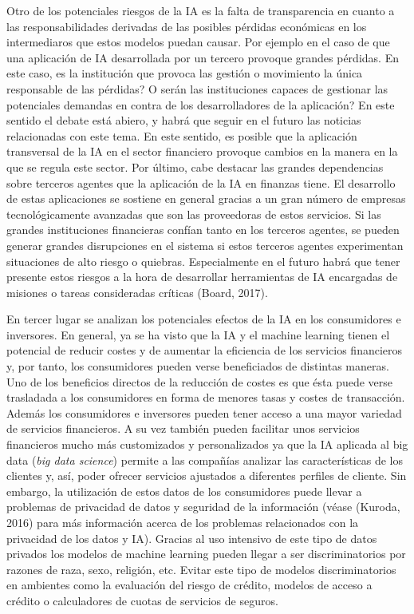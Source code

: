 \documentclass[]{DissertateUSU}
\begin{document}
\noindent Otro de los potenciales riesgos de la IA es la falta de
transparencia en cuanto a las responsabilidades derivadas de las
posibles pérdidas económicas en los intermediaros que estos modelos
puedan causar. Por ejemplo en el caso de que una aplicación de IA
desarrollada por un tercero provoque grandes pérdidas. En este caso, es
la institución que provoca las gestión o movimiento la única responsable
de las pérdidas? O serán las instituciones capaces de gestionar las
potenciales demandas en contra de los desarrolladores de la aplicación?
En este sentido el debate está abiero, y habrá que seguir en el futuro
las noticias relacionadas con este tema. En este sentido, es posible que
la aplicación transversal de la IA en el sector financiero provoque
cambios en la manera en la que se regula este sector. Por último, cabe
destacar las grandes dependencias sobre terceros agentes que la
aplicación de la IA en finanzas tiene. El desarrollo de estas
aplicaciones se sostiene en general gracias a un gran número de empresas
tecnológicamente avanzadas que son las proveedoras de estos servicios.
Si las grandes instituciones financieras confían tanto en los terceros
agentes, se pueden generar grandes disrupciones en el sistema si estos
terceros agentes experimentan situaciones de alto riesgo o quiebras.
Especialmente en el futuro habrá que tener presente estos riesgos a la
hora de desarrollar herramientas de IA encargadas de misiones o tareas
consideradas críticas (Board, 2017).

\noindent En tercer lugar se analizan los potenciales efectos de la IA
en los consumidores e inversores. En general, ya se ha visto que la IA y
el machine learning tienen el potencial de reducir costes y de aumentar
la eficiencia de los servicios financieros y, por tanto, los
consumidores pueden verse beneficiados de distintas maneras. Uno de los
beneficios directos de la reducción de costes es que ésta puede verse
trasladada a los consumidores en forma de menores tasas y costes de
transacción. Además los consumidores e inversores pueden tener acceso a
una mayor variedad de servicios financieros. A su vez también pueden
facilitar unos servicios financieros mucho más customizados y
personalizados ya que la IA aplicada al big data (\emph{big data
science}) permite a las compañías analizar las características de los
clientes y, así, poder ofrecer servicios ajustados a diferentes perfiles
de cliente. Sin embargo, la utilización de estos datos de los
consumidores puede llevar a problemas de privacidad de datos y seguridad
de la información (véase (Kuroda, 2016) para más información acerca de
los problemas relacionados con la privacidad de los datos y IA). Gracias
al uso intensivo de este tipo de datos privados los modelos de machine
learning pueden llegar a ser discriminatorios por razones de raza, sexo,
religión, etc. Evitar este tipo de modelos discriminatorios en ambientes
como la evaluación del riesgo de crédito, modelos de acceso a crédito o
calculadores de cuotas de servicios de seguros.
\end{document}
